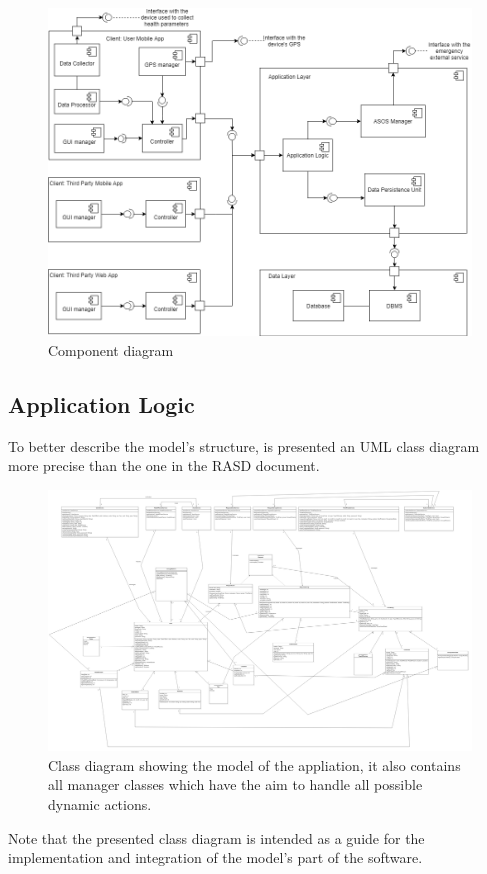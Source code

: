 \begin{figure}[h!]
	\includegraphics[width=1.0\textwidth]{./pictures/component_diagram.png}\par
	\caption{Component diagram}
\end{figure}
\FloatBarrier

\subsection{Application Logic}
To better describe the model's structure, is presented an UML class diagram more precise than the one in the RASD document. \\

\begin{figure}[h!]
	\includegraphics[width=1.0\textwidth]{./pictures/class_diagram.png}\par
	\caption{Class diagram showing the model of the appliation, it also contains all manager classes which have the aim to handle 			all possible dynamic actions.}
\end{figure}
\FloatBarrier
Note that the presented class diagram is intended as a guide for the implementation and integration of the model's part of the software.


